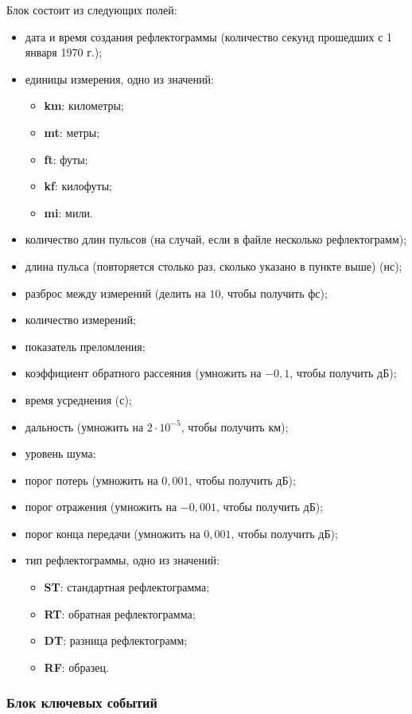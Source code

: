 Блок состоит из следующих полей:
\begin{itemize}
  \item дата и время создания рефлектограммы (количество секунд прошедших с 1 января 1970 г.);
  \item единицы измерения, одно из значений:
  \begin{itemize}
    \item \textbf{km}: километры;
    \item \textbf{mt}: метры;
    \item \textbf{ft}: футы;
    \item \textbf{kf}: килофуты;
    \item \textbf{mi}: мили.
  \end{itemize}
  \item количество длин пульсов (на случай, если в файле несколько рефлектограмм);
  \item длина пульса (повторяется столько раз, сколько указано в пункте выше) (нс);
  \item разброс между измерений (делить на $10$, чтобы получить фс);
  \item количество измерений;
  \item показатель преломления;
  \item коэффициент обратного рассеяния (умножить на $-0,1$, чтобы получить дБ);
  \item время усреднения (с);
  \item дальность (умножить на $2\cdot 10^{-5}$, чтобы получить км);
  \item уровень шума;
  \item порог потерь (умножить на $0,001$, чтобы получить дБ);
  \item порог отражения (умножить на $-0,001$, чтобы получить дБ);
  \item порог конца передачи (умножить на $0,001$, чтобы получить дБ);
  \item тип рефлектограммы, одно из значений:
  \begin{itemize}
    \item \textbf{ST}: стандартная рефлектограмма;
    \item \textbf{RT}: обратная рефлектограмма;
    \item \textbf{DT}: разница рефлектограмм;
    \item \textbf{RF}: образец.
  \end{itemize}
\end{itemize}

\subsubsection{Блок ключевых событий}

